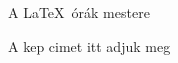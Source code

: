 \documentclass[a4paper]{article}
\begin{document}
\begin{figure}[bp]
\center
{}
\caption{A \LaTeX\ órák mestere}
\label{fig:sarkany}
\end{figure}
\begin{figure}[h!]
\centering
{}
\caption{A kep cimet itt adjuk meg}
\end{figure}
\end{document}
